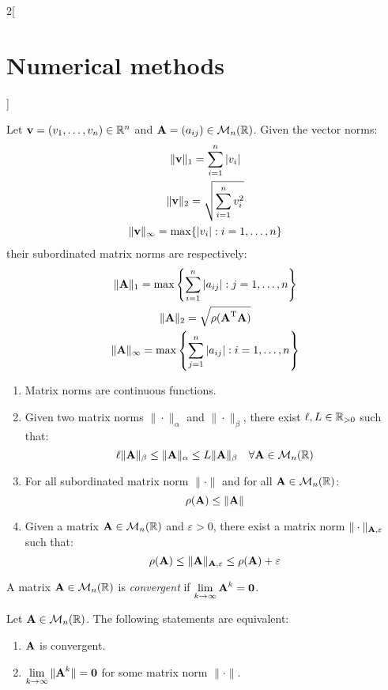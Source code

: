 \documentclass[../../../main.tex]{subfiles}
\begin{document}
\begin{multicols}{2}[\section{Numerical methods}]
\begin{proposition}
    Let $\boldsymbol{\mathrm{v}}=(v_1,\ldots,v_n)\in\mathbb{R}^n$ and $\boldsymbol{\mathrm{A}}=(a_{ij})\in\mathcal{M}_n(\mathbb{R})$. Given the vector norms:
    \begin{gather*}
      \|\boldsymbol{\mathrm{v}}\|_1=\sum_{i=1}^n|v_i|\\
      \|\boldsymbol{\mathrm{v}}\|_2=\sqrt{\sum_{i=1}^nv_i^2}\\
      \|\boldsymbol{\mathrm{v}}\|_\infty=\max\{|v_i|:i=1,\ldots,n\}
    \end{gather*}
    their subordinated matrix norms are respectively:
    \begin{gather*}
      \|\boldsymbol{\mathrm{A}}\|_1=\max\left\{\sum_{i=1}^n|a_{ij}|:j=1,\ldots,n\right\}\\
      \|\boldsymbol{\mathrm{A}}\|_2=\sqrt{\rho(\vb{\boldsymbol{\mathrm{A}}}^{\mathrm{T}}\boldsymbol{\mathrm{A}})}\\
      \|\boldsymbol{\mathrm{A}}\|_\infty=\max\left\{\sum_{j=1}^n|a_{ij}|:i=1,\ldots,n\right\}
    \end{gather*}
  \end{proposition}
  \begin{proposition}
    \hfill
    \begin{enumerate}
      \item Matrix norms are continuous functions.
      \item Given two matrix norms $\|\cdot\|_\alpha$ and $\|\cdot\|_\beta$, there exist $\ell, L\in\mathbb{R}_{>0}$ such that: $$\ell \|\boldsymbol{\mathrm{A}}\|_\beta\leq\|\boldsymbol{\mathrm{A}}\|_\alpha\leq L\|\boldsymbol{\mathrm{A}}\|_\beta\quad\forall\boldsymbol{\mathrm{A}}\in\mathcal{M}_n(\mathbb{R})$$
      \item For all subordinated matrix norm $\|\cdot\|$ and for all $\boldsymbol{\mathrm{A}}\in\mathcal{M}_n(\mathbb{R})$: $$\rho(\boldsymbol{\mathrm{A}})\leq\|\boldsymbol{\mathrm{A}}\|$$
      \item Given a matrix $\boldsymbol{\mathrm{A}}\in\mathcal{M}_n(\mathbb{R})$ and $\varepsilon>0$, there exist a matrix norm $\|\cdot\|_{\boldsymbol{\mathrm{A}},\varepsilon}$ such that: $$\rho(\boldsymbol{\mathrm{A}})\leq\|\boldsymbol{\mathrm{A}}\|_{\boldsymbol{\mathrm{A}},\varepsilon}\leq\rho(\boldsymbol{\mathrm{A}})+\varepsilon$$
    \end{enumerate}
  \end{proposition}
  \begin{definition}
    A matrix $\boldsymbol{\mathrm{A}}\in\mathcal{M}_n(\mathbb{R})$ is \emph{convergent} if $\displaystyle\lim_{k\to\infty}\boldsymbol{\mathrm{A}}^k=\boldsymbol{\mathrm{0}}$.
  \end{definition}
  \begin{theorem}
    Let $\boldsymbol{\mathrm{A}}\in\mathcal{M}_n(\mathbb{R})$. The following statements are equivalent:
    \begin{enumerate}
      \item $\boldsymbol{\mathrm{A}}$ is convergent.
      \item $\displaystyle\lim_{k\to\infty}\|\boldsymbol{\mathrm{A}}^k\|=\boldsymbol{\mathrm{0}}$ for some matrix norm $\|\cdot\|$.

\end{enumerate}
\end{theorem}
\end{multicols}
\end{document}
